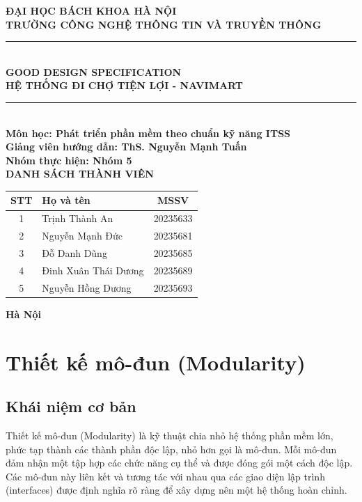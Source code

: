 \documentclass[12pt,a4paper]{article}
\begin{document}
\begin{titlepage}
    \begin{center}
        \textbf{\Large ĐẠI HỌC BÁCH KHOA HÀ NỘI} \\
        \textbf{\Large TRƯỜNG CÔNG NGHỆ THÔNG TIN VÀ TRUYỀN THÔNG} \\
        \vskip 3cm
        \noindent\rule{\textwidth}{2pt} \\
        \vskip 0.6cm
        \textbf{\Huge GOOD DESIGN SPECIFICATION} \\[0.5em]
        \textbf{\huge HỆ THỐNG ĐI CHỢ TIỆN LỢI - NAVIMART} \\
        \noindent\rule{\textwidth}{2pt} \\
        \vskip 1.5cm
        \textbf{\large Môn học: Phát triển phần mềm theo chuẩn kỹ năng ITSS} \\
        \textbf{\large Giảng viên hướng dẫn: ThS. Nguyễn Mạnh Tuấn} \\
        \textbf{\large Nhóm thực hiện: Nhóm 5} \\
        \vskip 1.5cm
        \textbf{\large DANH SÁCH THÀNH VIÊN} \\
        \vskip 0.4cm
        \begin{tabular}{|c|l|c|}
            \hline
            \textbf{STT} & \textbf{Họ và tên} & \textbf{MSSV} \\
            \hline
            1 & Trịnh Thành An & 20235633 \\
            \hline
            2 & Nguyễn Mạnh Đức & 20235681 \\
            \hline
            3 & Đỗ Danh Dũng & 20235685 \\
            \hline
            4 & Đinh Xuân Thái Dương & 20235689 \\
            \hline
            5 & Nguyễn Hồng Dương & 20235693 \\
            \hline
        \end{tabular}
        \vfill
        \textbf{Hà Nội}
    \end{center}
\end{titlepage}

\tableofcontents
\newpage

\section{Thiết kế mô-đun (Modularity)}

\subsection{Khái niệm cơ bản}
Thiết kế mô-đun (Modularity) là kỹ thuật chia nhỏ hệ thống phần mềm lớn, phức tạp thành các thành phần độc lập, nhỏ hơn gọi là mô-đun. Mỗi mô-đun đảm nhận một tập hợp các chức năng cụ thể và được đóng gói một cách độc lập. Các mô-đun này liên kết và tương tác với nhau qua các giao diện lập trình (interfaces) được định nghĩa rõ ràng để xây dựng nên một hệ thống hoàn chỉnh.
\end{document}
